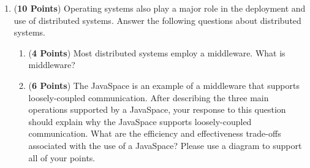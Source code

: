 \documentclass[12pt,epsf,psfig,graphics]{article}
\begin{document}
\begin{enumerate}
  \newpage

\item ({\bf 10 Points}) Operating systems also play a major role in the deployment and use of distributed systems.
  Answer the following questions about distributed systems.

  \begin{enumerate}

    \item ({\bf 4 Points}) Most distributed systems employ a middleware.  What is middleware?

    \item ({\bf 6 Points}) The JavaSpace is an example of a middleware that supports loosely-coupled communication.
      After describing the three main operations supported by a JavaSpace, your response to this question should explain
      why the JavaSpace supports loosely-coupled communication. What are the efficiency and effectiveness trade-offs
      associated with the use of a JavaSpace? Please use a diagram to support all of your points.

  \end{enumerate}

\end{enumerate}
\end{document}
